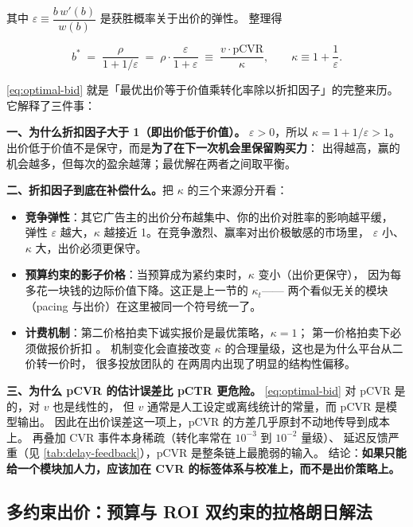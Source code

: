 其中 $\varepsilon \equiv \dfrac{b\,w'(b)}{w(b)}$ 是获胜概率关于出价的弹性。
整理得

\begin{equation}
b^{*} \;=\; \frac{\rho}{1 + 1/\varepsilon} \;=\; \rho \cdot \frac{\varepsilon}{1+\varepsilon} \;\equiv\; \frac{v \cdot \mathrm{pCVR}}{\kappa},
\qquad \kappa \equiv 1 + \frac{1}{\varepsilon} .
\label{eq:optimal-bid}
\end{equation}

\eqref{eq:optimal-bid} 就是「最优出价等于价值乘转化率除以折扣因子」的完整来历。
它解释了三件事：

\textbf{一、为什么折扣因子大于 1（即出价低于价值）。}
$\varepsilon > 0$，所以 $\kappa = 1 + 1/\varepsilon > 1$。
出价低于价值不是保守，而是\textbf{为了在下一次机会里保留购买力}：
出得越高，赢的机会越多，但每次的盈余越薄；最优解在两者之间取平衡。

\textbf{二、折扣因子到底在补偿什么。}把 $\kappa$ 的三个来源分开看：
\begin{itemize}
  \item \textbf{竞争弹性}：其它广告主的出价分布越集中、你的出价对胜率的影响越平缓，
        弹性 $\varepsilon$ 越大，$\kappa$ 越接近 1。在竞争激烈、赢率对出价极敏感的市场里，
        $\varepsilon$ 小、$\kappa$ 大，出价必须更保守。
  \item \textbf{预算约束的影子价格}：当预算成为紧约束时，$\kappa$ 变小（出价更保守），
        因为每多花一块钱的边际价值下降。这正是上一节的 $\kappa_t$——
        两个看似无关的模块（pacing 与出价）在这里被同一个符号统一了。
  \item \textbf{计费机制}：第二价格拍卖下诚实报价是最优策略，$\kappa = 1$；
        第一价格拍卖下必须做报价折扣 \cite{krengel2019firstprice}。
        机制变化会直接改变 $\kappa$ 的合理量级，这也是为什么平台从二价转一价时，
        很多投放团队的  在两周内出现了明显的结构性偏移。
\end{itemize}

\textbf{三、为什么 pCVR 的估计误差比 pCTR 更危险。}
\eqref{eq:optimal-bid} 对 $\mathrm{pCVR}$ 是的，对 $v$ 也是线性的，
但 $v$ 通常是人工设定或离线统计的常量，而 $\mathrm{pCVR}$ 是模型输出。
因此在出价误差这一项上，pCVR 的方差几乎原封不动地传导到成本上。
再叠加 CVR 事件本身稀疏（转化率常在 $10^{-3}$ 到 $10^{-2}$ 量级）、
延迟反馈严重（见 \cref{tab:delay-feedback}），pCVR 是整条链上最脆弱的输入。
结论：\textbf{如果只能给一个模块加人力，应该加在 CVR 的标签体系与校准上，而不是出价策略上。}

\subsection{多约束出价：预算与 ROI 双约束的拉格朗日解法}

